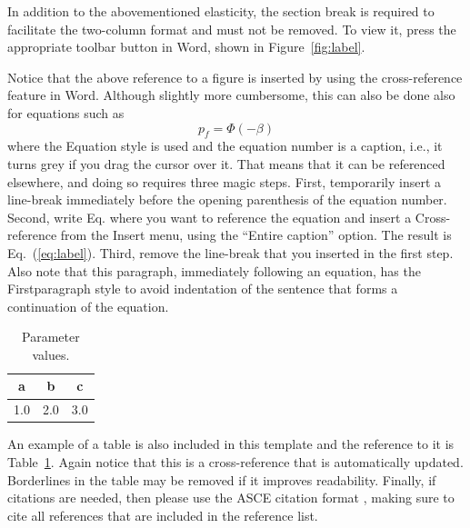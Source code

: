 \documentclass{ICASP13Paper}
\begin{document}
\par
In addition to the abovementioned elasticity, the section break is required to 
facilitate the two-column format and must not be removed. To view it, press the 
appropriate toolbar button in Word, shown in Figure~\ref{fig:label}. 
\par
Notice that the above reference to a figure is inserted by using the 
cross-reference feature in Word. Although slightly more cumbersome, this can 
also be done also for equations such as
\begin{equation} \label{eq:label}
  p_f = \varPhi(-\beta)
\end{equation}
where the Equation style is used and the equation number is a caption, i.e., it 
turns grey if you drag the cursor over it. That means that it can be referenced 
elsewhere, and doing so requires three magic steps. First, temporarily insert a 
line-break immediately before the opening parenthesis of the equation number. 
Second, write Eq. where you want to reference the equation and insert a 
Cross-reference from the Insert menu, using the “Entire caption” option. The 
result is Eq.~(\ref{eq:label}). Third, remove the line-break that you inserted 
in the first step. Also note that this paragraph, immediately following an 
equation, has the Firstparagraph style to avoid indentation of the sentence 
that forms a continuation of the equation.
\begin{table}[h!]
  \caption{Parameter values.}
  \label{tab:label}
  \centering
    \begin{tabular}{|c|c|c|}
      \hline
      a & b & c \\
      \hline
      1.0 & 2.0 & 3.0 \\
      \hline
    \end{tabular}
\end{table}
\par
An example of a table is also included in this template and the reference to it 
is Table~\ref{tab:label}. Again notice that this is a cross-reference that is 
automatically updated. Borderlines in the table may be removed if it improves 
readability. Finally, if citations are needed, then please use the ASCE 
citation format \cite{Kiureghian2009}, making sure to cite all references that 
are included in the reference list.
\end{document}
